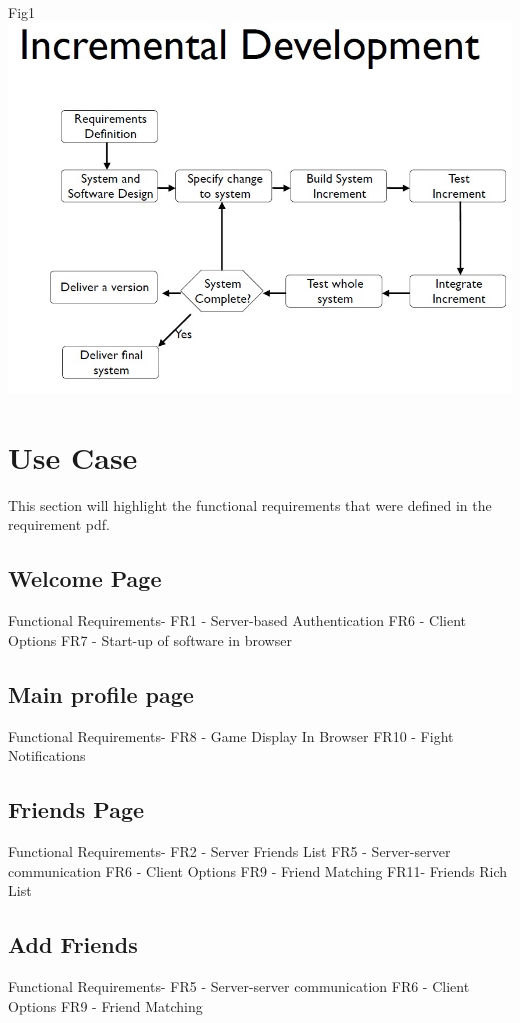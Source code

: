 \documentclass{project}
\begin{document}
Fig1
\includegraphics[scale=0.5]{incremental.jpg}\\

\section{Use Case}
This section will highlight the functional requirements that were defined in the
requirement pdf.

\subsection{Welcome Page}
Functional Requirements-
FR1 - Server-based Authentication
FR6 - Client Options
FR7 - Start-up of software in browser

\subsection{Main profile page}
Functional Requirements-
FR8 - Game Display In Browser
FR10 - Fight Notifications

\subsection{Friends Page}
Functional Requirements-
FR2 - Server Friends List
FR5 - Server-server communication
FR6 - Client Options
FR9 - Friend Matching
FR11- Friends Rich List

\subsection{Add Friends}
Functional Requirements-
FR5 - Server-server communication
FR6 - Client Options
FR9 - Friend Matching
\end{document}
